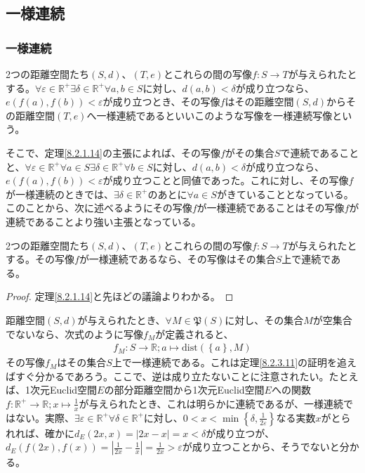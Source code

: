 \documentclass[dvipdfmx]{jsarticle}
\begin{document}
\subsection{一様連続}%
\subsubsection{一様連続}%
\begin{dfn}
2つの距離空間たち$(S,d)$、$(T,e)$とこれらの間の写像$f:S \rightarrow T$が与えられたとする。$\forall\varepsilon \in \mathbb{R}^{+}\exists\delta \in \mathbb{R}^{+}\forall a,b \in S$に対し、$d(a,b) < \delta$が成り立つなら、$e\left( f(a),f(b) \right) < \varepsilon$が成り立つとき、その写像$f$はその距離空間$(S,d)$からその距離空間$(T,e)$へ一様連続であるといいこのような写像を一様連続写像という。
\end{dfn}\par
そこで、定理\ref{8.2.1.14}の主張によれば、その写像$f$がその集合$S$で連続であることと、$\forall\varepsilon \in \mathbb{R}^{+}\forall a \in S\exists\delta \in \mathbb{R}^{+}\forall b \in S$に対し、$d(a,b) < \delta$が成り立つなら、$e\left( f(a),f(b) \right) < \varepsilon$が成り立つことと同値であった。これに対し、その写像$f$が一様連続のときでは、$\exists\delta \in \mathbb{R}^{+}$のあとに$\forall a \in S$がきていることとなっている。このことから、次に述べるようにその写像$f$が一様連続であることはその写像$f$が連続であることより強い主張となっている。
\begin{thm}\label{8.2.4.1}
2つの距離空間たち$(S,d)$、$(T,e)$とこれらの間の写像$f:S \rightarrow T$が与えられたとする。その写像$f$が一様連続であるなら、その写像はその集合$S$上で連続である。
\end{thm}
\begin{proof} 定理\ref{8.2.1.14}と先ほどの議論よりわかる。
\end{proof}\par
距離空間$(S,d)$が与えられたとき、$\forall M \in \mathfrak{P}(S)$に対し、その集合$M$が空集合でないなら、次式のように写像$f_{M}$が定義されると、
\begin{align*}
f_{M}:S \rightarrow \mathbb{R};a \mapsto \mathrm{dist}\left( \left\{ a \right\},M \right)
\end{align*}
その写像$f_{M}$はその集合$S$上で一様連続である。これは定理\ref{8.2.3.11}の証明を追えばすぐ分かるであろう。ここで、逆は成り立たないことに注意されたい。たとえば、1次元Euclid空間$E$の部分距離空間から1次元Euclid空間$E$への関数$f:\mathbb{R}^{+} \rightarrow \mathbb{R};x \mapsto \frac{1}{x}$が与えられたとき、これは明らかに連続であるが、一様連続ではない。実際、$\exists\varepsilon \in \mathbb{R}^{+}\forall\delta \in \mathbb{R}^{+}$に対し、$0 < x < \min\left\{ \delta,\frac{1}{2\varepsilon} \right\}$なる実数$x$がとられれば、確かに$d_{E}(2x,x) = |2x - x| = x < \delta$が成り立つが、$d_{E}\left( f(2x),f(x) \right) = \left| \frac{1}{2x} - \frac{1}{x} \right| = \frac{1}{2x} > \varepsilon$が成り立つことから、そうでないと分かる。
\end{document}
